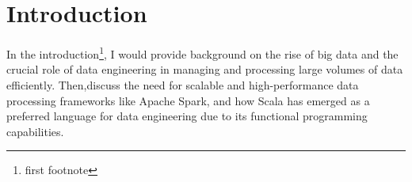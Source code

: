 \chapter*{Introduction}

In the introduction\footnote{first footnote}, I would provide background on the rise of big data and the crucial role of data engineering in managing and processing large volumes of data efficiently. Then,\footnotemark discuss the need for scalable and high-performance data processing frameworks like Apache Spark, and how Scala has emerged as a preferred language for data engineering due to its functional programming capabilities\cite{halliday_2018}.\footnotemark[\value{footnote}]

